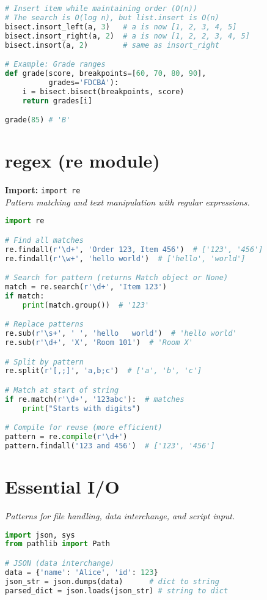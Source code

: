 \documentclass[8pt,landscape]{article}
\begin{document}
\begin{multicols}{3}
\begin{lstlisting}[language=Python]
# Insert item while maintaining order (O(n))
# The search is O(log n), but list.insert is O(n)
bisect.insort_left(a, 3)   # a is now [1, 2, 3, 4, 5]
bisect.insort_right(a, 2)  # a is now [1, 2, 2, 3, 4, 5]
bisect.insort(a, 2)        # same as insort_right

# Example: Grade ranges
def grade(score, breakpoints=[60, 70, 80, 90],
          grades='FDCBA'):
    i = bisect.bisect(breakpoints, score)
    return grades[i]

grade(85) # 'B'
\end{lstlisting}

\section*{regex (re module)}
\textbf{Import:} \lstinline|import re| \\
\textit{Pattern matching and text manipulation with regular expressions.}
\begin{lstlisting}[language=Python]
import re

# Find all matches
re.findall(r'\d+', 'Order 123, Item 456')  # ['123', '456']
re.findall(r'\w+', 'hello world')  # ['hello', 'world']

# Search for pattern (returns Match object or None)
match = re.search(r'\d+', 'Item 123')
if match:
    print(match.group())  # '123'

# Replace patterns
re.sub(r'\s+', ' ', 'hello   world')  # 'hello world'
re.sub(r'\d+', 'X', 'Room 101')  # 'Room X'

# Split by pattern
re.split(r'[,;]', 'a,b;c')  # ['a', 'b', 'c']

# Match at start of string
if re.match(r'\d+', '123abc'):  # matches
    print("Starts with digits")

# Compile for reuse (more efficient)
pattern = re.compile(r'\d+')
pattern.findall('123 and 456')  # ['123', '456']
\end{lstlisting}

\section*{Essential I/O}
\textit{Patterns for file handling, data interchange, and script input.}
\begin{lstlisting}[language=Python]
import json, sys
from pathlib import Path

# JSON (data interchange)
data = {'name': 'Alice', 'id': 123}
json_str = json.dumps(data)      # dict to string
parsed_dict = json.loads(json_str) # string to dict


\end{lstlisting}
\end{multicols}
\end{document}
